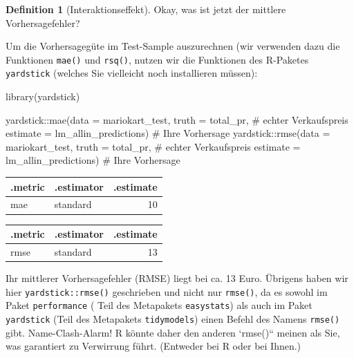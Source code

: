 \documentclass[
  letterpaper,
]{scrbook}
\newenvironment{Shaded}{\begin{snugshade}}{\end{snugshade}}
\newcommand{\AttributeTok}[1]{\textcolor[rgb]{0.40,0.45,0.13}{#1}}
\newcommand{\CommentTok}[1]{\textcolor[rgb]{0.37,0.37,0.37}{#1}}
\newcommand{\FunctionTok}[1]{\textcolor[rgb]{0.28,0.35,0.67}{#1}}
\newcommand{\NormalTok}[1]{\textcolor[rgb]{0.00,0.23,0.31}{#1}}
\newcommand{\SpecialCharTok}[1]{\textcolor[rgb]{0.37,0.37,0.37}{#1}}
\theoremstyle{definition}
\theoremstyle{definition}
\theoremstyle{definition}
\newtheorem{definition}{Definition}[chapter]
\theoremstyle{remark}
\begin{document}
\begin{definition}[Interaktionseffekt]
Okay, was ist jetzt der mittlere Vorhersagefehler?

Um die Vorhersagegüte im Test-Sample auszurechnen (wir verwenden dazu
die Funktionen \texttt{mae()} und \texttt{rsq()}, nutzen wir die
Funktionen des R-Paketes \texttt{yardstick} (welches Sie vielleicht noch
installieren müssen):

\begin{Shaded}
\begin{Highlighting}[]
\FunctionTok{library}\NormalTok{(yardstick)}

\NormalTok{yardstick}\SpecialCharTok{::}\FunctionTok{mae}\NormalTok{(}\AttributeTok{data =}\NormalTok{ mariokart\_test,}
               \AttributeTok{truth =}\NormalTok{ total\_pr,  }\CommentTok{\# echter Verkaufspreis}
               \AttributeTok{estimate =}\NormalTok{ lm\_allin\_predictions)  }\CommentTok{\# Ihre Vorhersage}
\NormalTok{yardstick}\SpecialCharTok{::}\FunctionTok{rmse}\NormalTok{(}\AttributeTok{data =}\NormalTok{ mariokart\_test,}
               \AttributeTok{truth =}\NormalTok{ total\_pr,  }\CommentTok{\# echter Verkaufspreis}
               \AttributeTok{estimate =}\NormalTok{ lm\_allin\_predictions)  }\CommentTok{\# Ihre Vorhersage}
\end{Highlighting}
\end{Shaded}

\begin{longtable}[]{@{}llr@{}}
\toprule\noalign{}
.metric & .estimator & .estimate \\
\midrule\noalign{}
\endhead
\bottomrule\noalign{}
\endlastfoot
mae & standard & 10 \\
\end{longtable}

\begin{longtable}[]{@{}llr@{}}
\toprule\noalign{}
.metric & .estimator & .estimate \\
\midrule\noalign{}
\endhead
\bottomrule\noalign{}
\endlastfoot
rmse & standard & 13 \\
\end{longtable}

Ihr mittlerer Vorhersagefehler (RMSE) liegt bei ca. 13 Euro. Übrigens
haben wir hier \texttt{yardstick::rmse()} geschrieben und nicht nur
\texttt{rmse()}, da es sowohl im Paket \texttt{performance} ( Teil des
Metapakets \texttt{easystats}) als auch im Paket \texttt{yardstick}
(Teil des Metapakets \texttt{tidymodels}) einen Befehl des Namens
\texttt{rmse()} gibt. Name-Clash-Alarm! R könnte daher den anderen
`rmse()`` meinen als Sie, was garantiert zu Verwirrung führt. (Entweder
bei R oder bei Ihnen.)


\end{definition}
\end{document}
